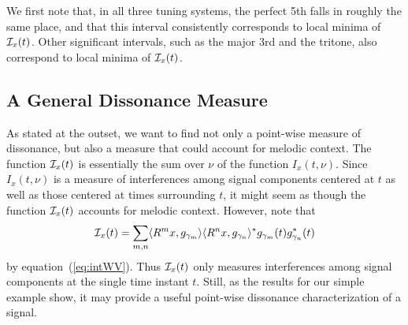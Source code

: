 
We first note that, in all three tuning systems, the perfect 5th falls in
roughly the same place, and that this interval consistently corresponds to
local minima of $\mathcal{I}_x(t)$. Other significant intervals, such as the major 3rd
and the tritone, also correspond to local minima of $\mathcal{I}_x(t)$.

\subsection{A General Dissonance Measure}
As stated at the outset, we want to find not only a point-wise measure of
dissonance, but also a measure that could account for melodic context.  The
function $\mathcal{I}_x(t)$ is essentially the sum over $\nu$ of the 
function $I_x(t,\nu)$.  Since $I_x(t,\nu)$ is a measure of interferences among
signal components centered at $t$ as well as those centered at times
surrounding $t$, it might seem as though the function $\mathcal{I}_x(t)$ accounts for
melodic context.  
However, note that
\[
\mathcal{I}_x(t) =\sum_{m,n}
      \langle R^mx,g_{\gamma_m}\rangle \langle R^nx,g_{\gamma_n}\rangle^*
        g_{\gamma_m}(t) g^*_{\gamma_n}(t)
\]
by equation~(\ref{eq:intWV}).
Thus $\mathcal{I}_x(t)$ only measures interferences among signal components at the
single time instant $t$. %
Still, as the results for our simple example show, it may provide a useful
point-wise dissonance characterization of a signal.

